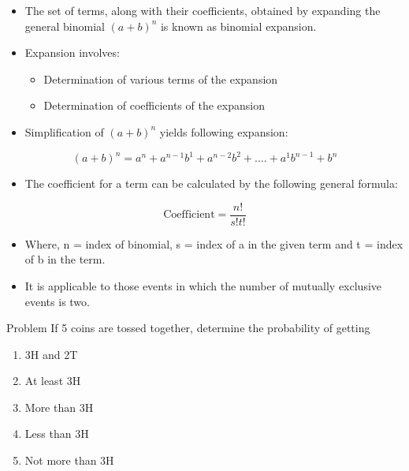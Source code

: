 \documentclass[11pt,ignorenonframetext,aspectratio=169]{beamer}
\providecommand{\tightlist}{%
  \setlength{\itemsep}{0pt}\setlength{\parskip}{0pt}}
\begin{document}
\begin{frame}{}
\protect\hypertarget{section-6}{}
\begin{itemize}
\tightlist
\item
  The set of terms, along with their coefficients, obtained by expanding
  the general binomial \((a + b)^n\) is known as binomial expansion.
\item
  Expansion involves:

  \begin{itemize}
  \tightlist
  \item
    Determination of various terms of the expansion
  \item
    Determination of coefficients of the expansion
  \end{itemize}
\item
  Simplification of \((a + b)^n\) yields following expansion:
\end{itemize}

\[
(a + b)^n = a^n + a^{n-1}b^1 + a^{n-2}b^2 + .... + a^1b^{n-1} + b^n
\]

\begin{itemize}
\tightlist
\item
  The coefficient for a term can be calculated by the following general
  formula:
\end{itemize}

\[
\text{Coefficient} = \frac{n!}{s! t!}
\]

\begin{itemize}
\tightlist
\item
  Where, n = index of binomial, s = index of a in the given term and t =
  index of b in the term.
\item
  It is applicable to those events in which the number of mutually
  exclusive events is two.
\end{itemize}
\end{frame}

\begin{frame}{Problem}
\protect\hypertarget{problem}{}
If 5 coins are tossed together, determine the probability of getting

\begin{enumerate}
\tightlist
\item
  3H and 2T
\item
  At least 3H
\item
  More than 3H
\item
  Less than 3H
\item
  Not more than 3H
\end{enumerate}
\end{frame}
\end{document}
